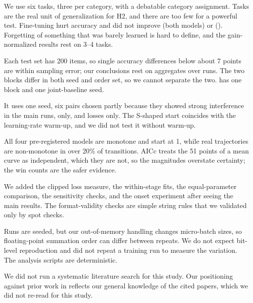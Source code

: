 We use six tasks, three per category, with a debatable category assignment.
Tasks are the real unit of generalization for H2, and there are too few for a powerful test.
Fine-tuning hurt \tgsm accuracy and did not improve \tarith (both models) or \tmt (\qwen).
Forgetting of something that was barely learned is hard to define, and the gain-normalized results rest on 3--4 tasks.

Each test set has 200 items, so single accuracy differences below about 7 points are within sampling error; our conclusions rest on aggregates over runs.
The two \llama blocks differ in both seed and order set, so we cannot separate the two.
\qwen has one block and one joint-baseline seed.

It uses one seed, six pairs chosen partly because they showed strong interference in the main runs, \llama only, and losses only.
The S-shaped start coincides with the learning-rate warm-up, and we did not test it without warm-up.

All four pre-registered models are monotone and start at 1, while real trajectories are non-monotone in over 20\% of transitions.
AICc treats the 51 points of a mean curve as independent, which they are not, so the \daicc magnitudes overstate certainty; the win counts are the safer evidence.

We added the clipped loss measure, the within-stage fits, the equal-parameter comparison, the sensitivity checks, and the onset experiment after seeing the main results.
The format-validity checks are simple string rules that we validated only by spot checks.

Runs are seeded, but our out-of-memory handling changes micro-batch sizes, so floating-point summation order can differ between repeats.
We do not expect bit-level reproduction and did not repeat a training run to measure the variation.
The analysis scripts are deterministic.

We did not run a systematic literature search for this study.
Our positioning against prior work in  reflects our general knowledge of the cited papers, which we did not re-read for this study.
